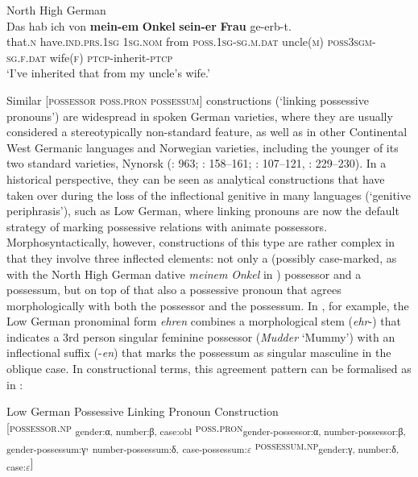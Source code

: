 \documentclass[output=paper]{langsci/langscibook}
\begin{document}
	\ex\label{ex:hoeder:15b}
	North High German\\
	\gll Das hab ich von \textbf{mein-em} \textbf{Onkel} \textbf{sein-er} \textbf{Frau} ge-erb-t.\\
     that.\textsc{n} have.\textsc{ind.prs.1sg} \textsc{1sg.nom}{} from \textsc{poss.1sg-sg.m.dat} uncle(\textsc{m}) \textsc{poss3sgm-sg.f.dat} wife(\textsc{f}) \textsc{ptcp-}inherit-\textsc{ptcp}\\
	\glt `I’ve inherited that from my uncle’s wife.'
\z
\z



Similar {[}\textsc{possessor} \textsc{poss.pron} \textsc{possessum}{]} constructions (‘linking possessive pronouns’) are widespread in spoken German varieties, where they are usually considered a stereotypically non-standard feature, as well as in other Continental West Germanic languages and Norwegian varieties, including the younger of its two standard varieties, Nynorsk (\citealt{KoptjevskajaTamm.2001}: 963; \citealt{Harbert.2007}: 158--161; \citealt{Hoder.2016a}: 107--121, \citealt{Gunleifsen.2011}: 229--230). In a historical perspective, they can be seen as analytical constructions that have taken over during the loss of the inflectional genitive in many languages (‘genitive periphrasis’), such as Low German, where linking pronouns are now the default strategy of marking possessive relations with animate possessors. Morphosyntactically, however, constructions of this type are rather complex in that they involve three inflected elements: not only a (possibly case-marked, as with the North High German dative \textit{meinem} \textit{Onkel} in ) possessor and a possessum, but on top of that also a possessive pronoun that agrees morphologically with both the possessor and the possessum. In , for example, the Low German pronominal form \textit{ehren} combines a morphological stem (\textit{ehr}-) that indicates a 3rd person singular feminine possessor (\textit{Mudder} ‘Mummy’) with an inflectional suffix (-\textit{en}) that marks the possessum as singular masculine in the oblique case. In constructional terms, this agreement pattern can be formalised as in :

\ea\label{ex:hoeder:16}
	Low German Possessive Linking Pronoun Construction\\
     {[}\textsc{possessor.np} \textsubscript{gender:α, number:β, case:obl} \textsc{poss.pron}\textsubscript{gender-possessor:α, number-possessor:β,} \textsubscript{gender-possessum:γ}, \textsubscript{number-possessum:δ,} \textsubscript{case-possessum:$\varepsilon$} \textsc{possessum.np}\textsubscript{gender:γ, number:δ, case:$\varepsilon$}{]}
     \z
     
\end{document}

